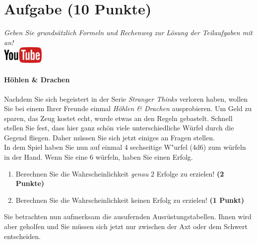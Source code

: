 \documentclass[a4paper, 10pt]{scrartcl}\usepackage[]{graphicx}\usepackage[]{xcolor}
\begin{document}
\clearpage\null 
\clearpage

\section{Aufgabe \hfill (10 Punkte)}

\textit{Geben Sie grunds{\"a}tzlich Formeln und Rechenweg zur L{\"o}sung der
  Teilaufgaben mit an!} \\[1Ex]

\hfill\href{https://youtu.be/8Pb2sKUIMyk}{\includegraphics[width =
  2cm]{img/youtube}} %
\hspace{2Ex}

\paragraph{H{\"o}hlen \& Drachen}



Nachdem Sie sich begeistert in der Serie \textit{Stranger Thinks} verloren
haben, wollen Sie bei einem Ihrer Freunde einmal \textit{H{\"o}hlen \& Drachen}
ausprobieren. Um Geld zu sparen, das Zeug kostet echt, wurde etwas an den
Regeln gebastelt. Schnell stellen Sie fest, dass hier ganz sch{\"o}n viele
unterschiedliche W{\"u}rfel durch die Gegend fliegen. Daher m{\"u}ssen Sie sich
jetzt einiges an Fragen stellen. \\%

In dem Spiel haben Sie nun auf einmal 4 sechseitige W{"u}rfel (4d6) zum w{\"u}rfeln in der Hand. Wenn Sie eine 6 w{\"u}rfeln,
haben Sie einen Erfolg.

\begin{enumerate}
\item Berechnen Sie die Wahrscheinlichkeit \textit{genau}
  2 Erfolge zu erzielen!  \textbf{(2 Punkte)}
\item Berechnen Sie die Wahrscheinlichkeit keinen Erfolg zu erzielen!
  \textbf{(1 Punkt)}
\end{enumerate}

Sie betrachten nun aufmerksam die ausufernden Ausr{\"u}stungstabellen. Ihnen
wird aber geholfen und Sie m{\"u}ssen sich jetzt nur zwischen der Axt oder dem
Schwert entscheiden.
\end{document}
